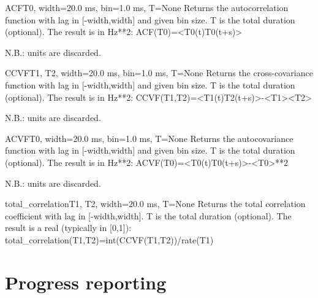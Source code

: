 \documentclass[letterpaper,10pt,english]{manual}
\begin{document}
\hypertarget{brian.ACF}{}\begin{funcdesc}{ACF}{T0, width=20.0 ms, bin=1.0 ms, T=None}
Returns the autocorrelation function with lag in {[}-width,width{]} and given bin size.
T is the total duration (optional).
The result is in Hz**2:
ACF(T0)=\textless{}T0(t)T0(t+s)\textgreater{}

N.B.: units are discarded.
\end{funcdesc}

\hypertarget{brian.CCVF}{}\begin{funcdesc}{CCVF}{T1, T2, width=20.0 ms, bin=1.0 ms, T=None}
Returns the cross-covariance function with lag in {[}-width,width{]} and given bin size.
T is the total duration (optional).
The result is in Hz**2:
CCVF(T1,T2)=\textless{}T1(t)T2(t+s)\textgreater{}-\textless{}T1\textgreater{}\textless{}T2\textgreater{}

N.B.: units are discarded.
\end{funcdesc}

\hypertarget{brian.ACVF}{}\begin{funcdesc}{ACVF}{T0, width=20.0 ms, bin=1.0 ms, T=None}
Returns the autocovariance function with lag in {[}-width,width{]} and given bin size.
T is the total duration (optional).
The result is in Hz**2:
ACVF(T0)=\textless{}T0(t)T0(t+s)\textgreater{}-\textless{}T0\textgreater{}**2

N.B.: units are discarded.
\end{funcdesc}

\hypertarget{brian.total_correlation}{}\begin{funcdesc}{total\_correlation}{T1, T2, width=20.0 ms, T=None}
Returns the total correlation coefficient with lag in {[}-width,width{]}.
T is the total duration (optional).
The result is a real (typically in {[}0,1{]}):
total\_correlation(T1,T2)=int(CCVF(T1,T2))/rate(T1)
\end{funcdesc}

\resetcurrentobjects
\hypertarget{--doc-reference-progressreporting}{}

\hypertarget{index-109}{}\section{Progress reporting}
\end{document}

